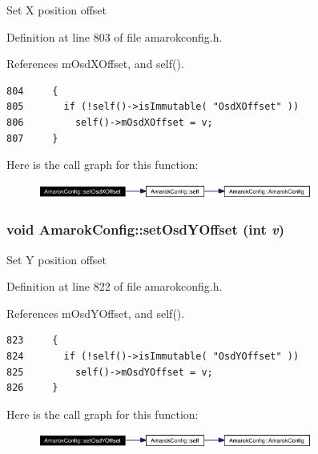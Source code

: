 Set X position offset 

Definition at line 803 of file amarokconfig.h.

References m\-Osd\-XOffset, and self().



\footnotesize\begin{verbatim}804     {
805       if (!self()->isImmutable( "OsdXOffset" ))
806         self()->mOsdXOffset = v;
807     }
\end{verbatim}\normalsize 


Here is the call graph for this function:\begin{figure}[H]
\begin{center}
\leavevmode
\includegraphics[width=256pt]{classAmarokConfig_AmarokConfige83_cgraph}
\end{center}
\end{figure}
\subsubsection{\setlength{\rightskip}{0pt plus 5cm}void Amarok\-Config::set\-Osd\-YOffset (int {\em v})\hspace{0.3cm}{\tt  [inline, static]}}\label{classAmarokConfig_AmarokConfige85}


Set Y position offset 

Definition at line 822 of file amarokconfig.h.

References m\-Osd\-YOffset, and self().



\footnotesize\begin{verbatim}823     {
824       if (!self()->isImmutable( "OsdYOffset" ))
825         self()->mOsdYOffset = v;
826     }
\end{verbatim}\normalsize 


Here is the call graph for this function:\begin{figure}[H]
\begin{center}
\leavevmode
\includegraphics[width=256pt]{classAmarokConfig_AmarokConfige85_cgraph}
\end{center}
\end{figure}
